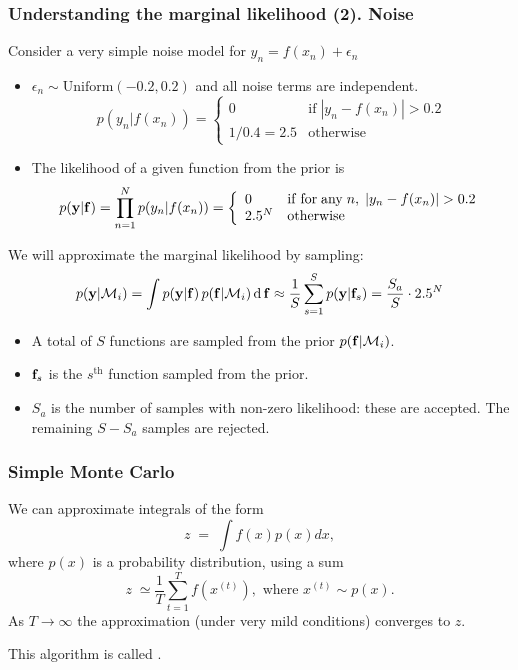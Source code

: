 \begin{frame}
\frametitle{Understanding the marginal likelihood (2). Noise}

Consider a very simple noise model for $y_n = f(x_n) + \epsilon_n$
\begin{itemize}
\item $\epsilon_n\sim\mathrm{Uniform}(-0.2, 0.2)$ and all noise terms are independent.
\[
p(y_n|f(x_n))= \left\{ 
\begin{array}{ll}  0 & \mathrm{if\; } |y_n-f(x_n)|>0.2\\
  1/0.4=2.5 &  \mathrm{otherwise}
\end{array}
 \right.
\]
\item The likelihood of a given function from the prior is 
%
\[
p(\bfy|\bff)=\prod_{n=1}^Np(y_n|f(x_n))=
\left\{
\begin{array}{ll}
0 &\mathrm{if\;for\;any\;}n, \; |y_n-f(x_n)|>0.2 \\
2.5^N &\mathrm{otherwise}
\end{array}
\right.
\]
%
\end{itemize}

We will approximate the marginal likelihood by  sampling:
%
\[
p(\mathbf y|\mathcal{M}_i)=\int p(\mathbf y|\mathbf f)\,p(\mathbf f|\mathcal{M}_i)\,\mathbf{\mathrm{d}}\,\mathbf f
\approx \frac{1}{S}\sum_{s=1}^{S} p(\mathbf y|\mathbf f_s) = \frac{S_a}{S}\cdot2.5^N
\]
%
\vspace*{-2ex}
\begin{itemize}
\item A total of $S$ functions are sampled from the prior $p(\mathbf f|\mathcal{M}_i)$. 
\item $\mathbf f_s$ is the $s^\mathrm{th}$ function sampled from the prior.
\item $S_a$ is the number of samples with non-zero likelihood: these are accepted. The 
remaining $S-S_a$ samples are rejected.
\end{itemize}

\end{frame}



\begin{frame}
\frametitle{Simple Monte Carlo}

We can approximate integrals of the form
\[
z\;=\;\int f(x) p(x) dx,
\]
where $p(x)$ is a probability distribution, using a sum
\[
z\;\simeq\frac{1}{T}\sum_{t=1}^T f(x^{(t)}),\text{\ \ where\ \ }x^{(t)}\sim p(x).
\]
As $T\rightarrow \infty$ the approximation (under very mild conditions)
converges to $z$.

This algorithm is called .
\end{frame}



